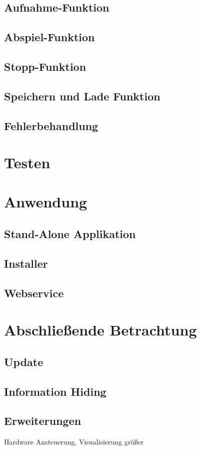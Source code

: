 		\subsection{Aufnahme-Funktion}	
		\subsection{Abspiel-Funktion}
		\subsection{Stopp-Funktion}
		\subsection{Speichern und Lade Funktion}
			
		\subsection{Fehlerbehandlung}

\section{Testen}		

\section{Anwendung}
	\subsection{Stand-Alone Applikation}
	\subsection{Installer}
	\subsection{Webservice}

\section{Abschließende Betrachtung}
	\subsection{Update }%
	\subsection{Information Hiding} %
	\subsection{Erweiterungen}
	Hardware Ansteuerung, Visualisierung größer

